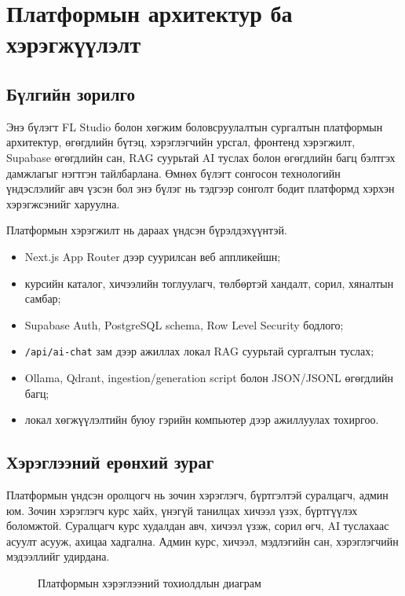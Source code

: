 
\chapter{Платформын архитектур ба хэрэгжүүлэлт}
\label{Chapter3}

\section{Бүлгийн зорилго}
Энэ бүлэгт FL Studio болон хөгжим боловсруулалтын сургалтын платформын архитектур, өгөгдлийн бүтэц, хэрэглэгчийн урсгал, фронтенд хэрэгжилт, Supabase өгөгдлийн сан, RAG суурьтай AI туслах болон өгөгдлийн багц бэлтгэх дамжлагыг нэгтгэн тайлбарлана. Өмнөх бүлэгт сонгосон технологийн үндэслэлийг авч үзсэн бол энэ бүлэг нь тэдгээр сонголт бодит платформд хэрхэн хэрэгжсэнийг харуулна.

Платформын хэрэгжилт нь дараах үндсэн бүрэлдэхүүнтэй.
\begin{itemize}
  \item Next.js App Router дээр суурилсан веб аппликейшн;
  \item курсийн каталог, хичээлийн тоглуулагч, төлбөртэй хандалт, сорил, хяналтын самбар;
  \item Supabase Auth, PostgreSQL schema, Row Level Security бодлого;
  \item \texttt{/api/ai-chat} зам дээр ажиллах локал RAG суурьтай сургалтын туслах;
  \item Ollama, Qdrant, ingestion/generation script болон JSON/JSONL өгөгдлийн багц;
  \item локал хөгжүүлэлтийн буюу гэрийн компьютер дээр ажиллуулах тохиргоо.
\end{itemize}

\section{Хэрэглээний ерөнхий зураг}
Платформын үндсэн оролцогч нь зочин хэрэглэгч, бүртгэлтэй суралцагч, админ юм. Зочин хэрэглэгч курс хайх, үнэгүй танилцах хичээл үзэх, бүртгүүлэх боломжтой. Суралцагч курс худалдан авч, хичээл үзэж, сорил өгч, AI туслахаас асуулт асууж, ахицаа хадгална. Админ курс, хичээл, мэдлэгийн сан, хэрэглэгчийн мэдээллийг удирдана.

\begin{figure}[H]
  \centering
  \resizebox{0.95\textwidth}{!}{}
  \caption[Хэрэглээний тохиолдлын диаграм]{Платформын хэрэглээний тохиолдлын диаграм}
  \label{fig:ch3-usecase}
\end{figure}

